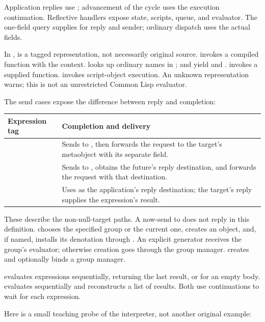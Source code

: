 Application replies use ; advancement of the cycle uses the
execution continuation. Reflective handlers expose state, scripts, queue, and
evaluator. The one-field  query supplies
 for reply and sender; ordinary dispatch uses the actual fields.

In ,  is a tagged representation, not necessarily
original source.  invokes a compiled function with the
context.  looks up ordinary names in ;
 and  yield \code{[den Id]} and .
 invokes a supplied function.
 invokes script-object execution.
An unknown representation warns; this is not an unrestricted Common Lisp
evaluator.

The send cases expose the difference between reply and completion:

\begin{longtable}{L{0.25\textwidth}L{0.65\textwidth}}
\textbf{Expression tag} & \textbf{Completion and delivery}\\\hline
\endhead
{} & Sends  to , then forwards the
request to the target's metaobject with its separate  field.\\
 & Sends  to , obtains the future's
reply destination, and forwards the request with that destination.\\
 & Uses  as the application's reply destination;
the target's reply supplies the expression's result.\\
\end{longtable}

These describe the non-null-target paths. A now-send to 
does not reply in this definition.
 chooses the specified group or the current one,
creates an object, and, if named, installs its denotation through
. An explicit generator receives the group's evaluator;
otherwise creation goes through the group manager.
 creates and optionally binds a group manager.

 evaluates expressions sequentially, returning the last
result, or  for an empty body.
 evaluates sequentially and reconstructs a list of
results. Both use continuations to wait for each expression.

Here is a small teaching probe of the interpreter, not another original example:

